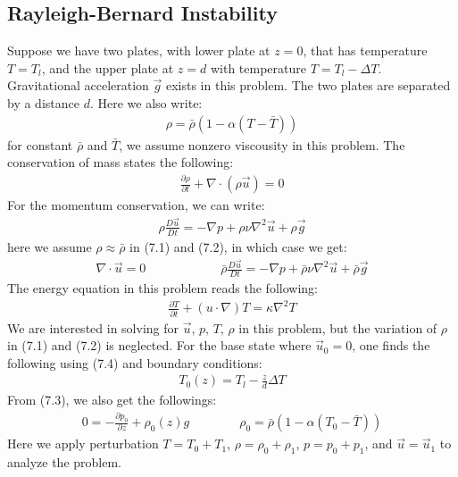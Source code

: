 \documentclass[11pt]{book}
\theoremstyle{break}
\theoremstyle{break}
\newcommand{\pd}{\partial}
\begin{document}
\subsection{Rayleigh-Bernard Instability}
Suppose we have two plates, with lower plate at $z=0$, that has temperature $T=T_l$, and the upper plate at $z = d$ with temperature $T = T_l - \Delta T$. Gravitational acceleration $\vec{g}$ exists in this problem. The two plates are separated by a distance $d$. Here we also write:
\begin{align*}
\rho = \bar{\rho}\left( 1- \alpha (T - \bar{T})\right)
\end{align*}
for constant $\bar{\rho}$ and $\bar{T}$, we assume nonzero viscousity in this problem. The conservation of mass states the following:
\begin{align}
\frac{\pd \rho}{\pd t} + \nabla\cdot (\rho \vec{u}) = 0 
\end{align}
For the momentum conservation, we can write:
\begin{align}
\rho \frac{D\vec{u}}{Dt}  = -\nabla p + \rho \nu \nabla^2 \vec{u}+ \rho \vec{g}
\end{align}
here we assume $\rho \approx \bar{\rho}$ in (7.1) and (7.2), in which case we get:
\begin{align}
\nabla \cdot \vec{u} = 0\qquad\qquad\qquad \bar{\rho} \frac{D\vec{u}}{Dt}  = -\nabla p + \bar{\rho} \nu \nabla^2 \vec{u}+ \bar{\rho} \vec{g}
\end{align}
The energy equation in this problem reads the following:
\begin{align}
\frac{\pd T}{\pd t} + (u \cdot \nabla )T = \kappa \nabla^2 T
\end{align}
We are interested in solving for $\vec{u},\, p,\, T,\, \rho$ in this problem, but the variation of $\rho$ in (7.1) and (7.2) is neglected. For the base state where $\vec{u}_0 = 0$, one finds the following using (7.4) and boundary conditions:
\begin{align*}
T_0(z) = T_l - \frac{z}{d}\Delta T
\end{align*}
From (7.3), we also get the followings:
\begin{align*}
0  = -\frac{\pd p_0}{\pd z} + \rho_0(z) g \qquad\qquad \rho_0 = \bar{\rho}\left(1 - \alpha(T_0 - \bar{T})\right)
\end{align*}
Here we apply perturbation $T = T_0 + T_1$, $\rho = \rho_0 + \rho_1$, $ p =p_0 + p_1$, and $\vec{u} = \vec{u}_1$ to analyze the problem.  
\end{document}
